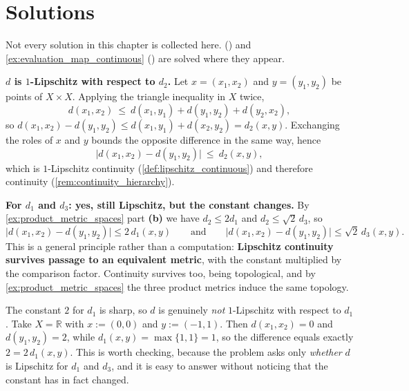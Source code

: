 
\section{Solutions}
\label{sec:continuity_solutions}

Not every solution in this chapter is collected here. 
() and \cref{ex:evaluation_map_continuous}
() are solved where they appear.

\begin{exercisesolution}
\label{sol:continuity_of_distance}
\textbf{$d$ is $1$-Lipschitz with respect to $d_2$.} Let $x = (x_1,x_2)$ and $y = (y_1,y_2)$ be
points of $X\times X$. Applying the triangle inequality in $X$ twice,
\[d(x_1,x_2) \ \leq\ d(x_1,y_1) + d(y_1,y_2) + d(y_2,x_2),\]
so $d(x_1,x_2) - d(y_1,y_2) \leq d(x_1,y_1) + d(x_2,y_2) = d_2(x,y)$. Exchanging the roles of
$x$ and $y$ bounds the opposite difference in the same way, hence
\[\big|d(x_1,x_2) - d(y_1,y_2)\big| \ \leq\ d_2(x,y),\]
which is $1$-Lipschitz continuity (\cref{def:lipschitz_continuous}) and therefore continuity
(\cref{rem:continuity_hierarchy}).

\textbf{For $d_1$ and $d_3$: yes, still Lipschitz, but the constant changes.} By
\cref{ex:product_metric_spaces} part \textbf{(b)} we have $d_2 \leq 2d_1$ and $d_2 \leq \sqrt2\,d_3$, so
\[\big|d(x_1,x_2)-d(y_1,y_2)\big| \leq 2\,d_1(x,y)
  \qquad\text{and}\qquad
  \big|d(x_1,x_2)-d(y_1,y_2)\big| \leq \sqrt2\,d_3(x,y).\]
This is a general principle rather than a computation: \textbf{Lipschitz continuity survives
passage to an equivalent metric}, with the constant multiplied by the comparison factor.
Continuity survives too, being topological, and by \cref{ex:product_metric_spaces} the three product metrics
induce the same topology.

\begin{remark}
The constant $2$ for $d_1$ is sharp, so $d$ is genuinely \emph{not} $1$-Lipschitz with respect
to $d_1$. Take $X = \mathbb{R}$ with $x := (0,0)$ and $y := (-1,1)$. Then $d(x_1,x_2) = 0$ and
$d(y_1,y_2) = 2$, while $d_1(x,y) = \max\{1,1\} = 1$, so the difference equals exactly
$2 = 2\,d_1(x,y)$. This is worth checking, because the problem asks only \emph{whether} $d$ is
Lipschitz for $d_1$ and $d_3$, and it is easy to answer  without
noticing that the constant has in fact changed.
\end{remark}
\end{exercisesolution}

